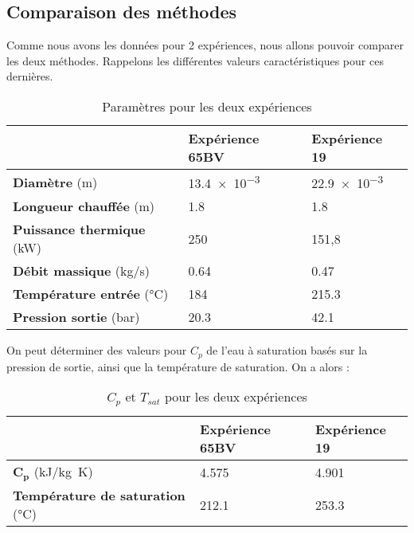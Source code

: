 \subsection{Comparaison des méthodes}
Comme nous avons les données pour 2 expériences, nous allons pouvoir comparer les deux méthodes.
Rappelons les différentes valeurs caractéristiques pour ces dernières.
\begin{table}[H]
\caption{Paramètres pour les deux expériences}
\vspace{5pt}
    \centering
    \begin{tabular}{@{}lll@{}}
        \toprule
               & \textbf{Expérience 65BV}& \textbf{Expérience 19}\\
        \midrule
          \textbf{Diamètre} (\si{m}) & \num{13.4e-3} & \num{22.9e-3} \\
          \textbf{Longueur chauffée} (\si{m}) & 1.8 & 1.8 \\
          \textbf{Puissance thermique} (\si{kW}) & 250 & 151,8 \\
          \textbf{Débit massique} (\si{kg/s})& \num{0,64} & \num{0.47} \\
          \textbf{Température entrée} (\si{\celsius})& 184 & 215.3 \\
          \textbf{Pression sortie} (\si{bar})& 20.3 & 42.1 \\
        \bottomrule  
    \end{tabular}
    \label{donnes}
\end{table}

On peut déterminer des valeurs pour $C_p$ de l'eau à saturation basés sur la pression de sortie, ainsi que la température de saturation. On a alors :
\begin{table}[H]
\caption{$C_p$ et $T_{sat}$ pour les deux expériences}
\vspace{5pt}
    \centering
    \begin{tabular}{@{}lll@{}}
        \toprule
               & \textbf{Expérience 65BV}& \textbf{Expérience 19}\\
        \midrule
          $\mathbf{C_p}$ (\si{kJ/kg K}) & \num{4.575} & \num{4,901} \\
          \textbf{Température de saturation} (\si{\celsius}) & 212.1 & 253.3 \\
        \bottomrule  
    \end{tabular}
    \label{donnes}
\end{table}


